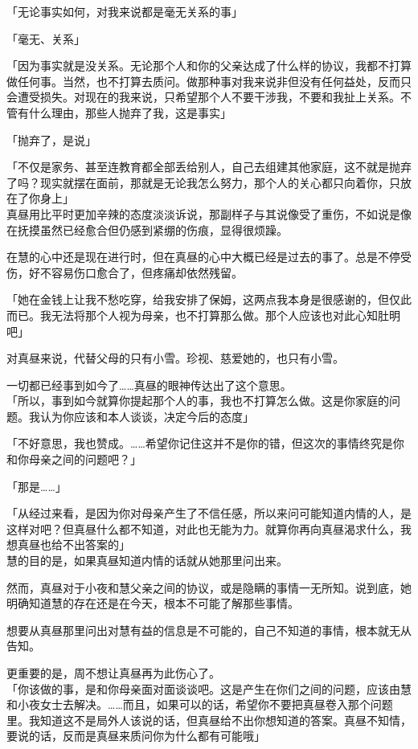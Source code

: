 「无论事实如何，对我来说都是毫无关系的事」

「毫无、关系」

「因为事实就是没关系。无论那个人和你的父亲达成了什么样的协议，我都不打算做任何事。当然，也不打算去质问。做那种事对我来说非但没有任何益处，反而只会遭受损失。对现在的我来说，只希望那个人不要干涉我，不要和我扯上关系。不管有什么理由，那些人抛弃了我，这是事实」

「抛弃了，是说」

「不仅是家务、甚至连教育都全部丢给别人，自己去组建其他家庭，这不就是抛弃了吗？现实就摆在面前，那就是无论我怎么努力，那个人的关心都只向着你，只放在了你身上」\\

真昼用比平时更加辛辣的态度淡淡诉说，那副样子与其说像受了重伤，不如说是像在抚摸虽然已经愈合但仍感到紧绷的伤痕，显得很烦躁。

在慧的心中还是现在进行时，但在真昼的心中大概已经是过去的事了。总是不停受伤，好不容易伤口愈合了，但疼痛却依然残留。

「她在金钱上让我不愁吃穿，给我安排了保姆，这两点我本身是很感谢的，但仅此而已。我无法将那个人视为母亲，也不打算那么做。那个人应该也对此心知肚明吧」

对真昼来说，代替父母的只有小雪。珍视、慈爱她的，也只有小雪。

一切都已经事到如今了……真昼的眼神传达出了这个意思。\\

「所以，事到如今就算你提起那个人的事，我也不打算怎么做。这是你家庭的问题。我认为你应该和本人谈谈，决定今后的态度」

「不好意思，我也赞成。……希望你记住这并不是你的错，但这次的事情终究是你和你母亲之间的问题吧？」

「那是……」

「从经过来看，是因为你对母亲产生了不信任感，所以来问可能知道内情的人，是这样对吧？但真昼什么都不知道，对此也无能为力。就算你再向真昼渴求什么，我想真昼也给不出答案的」\\

慧的目的是，如果真昼知道内情的话就从她那里问出来。

然而，真昼对于小夜和慧父亲之间的协议，或是隐瞒的事情一无所知。说到底，她明确知道慧的存在还是在今天，根本不可能了解那些事情。

想要从真昼那里问出对慧有益的信息是不可能的，自己不知道的事情，根本就无从告知。

更重要的是，周不想让真昼再为此伤心了。\\

「你该做的事，是和你母亲面对面谈谈吧。这是产生在你们之间的问题，应该由慧和小夜女士去解决。……而且，如果可以的话，希望你不要把真昼卷入那个问题里。我知道这不是局外人该说的话，但真昼给不出你想知道的答案。真昼不知情，要说的话，反而是真昼来质问你为什么都有可能哦」\\

